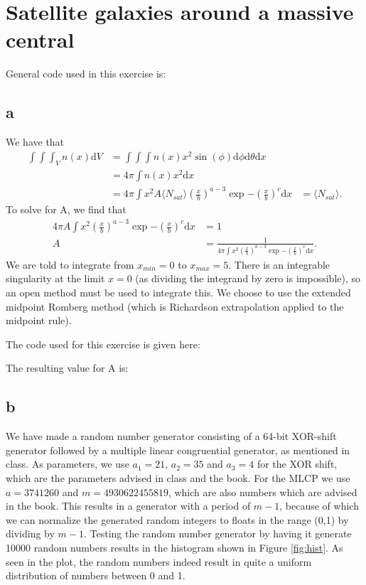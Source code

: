 \section{Satellite galaxies around a massive central}

General code used in this exercise is:




\subsection{a}

We have that
\begin{align*}
    \int\int\int_V n(x)\text{d}V &= \int\int\int n(x)x^2\sin(\phi)\text{d}\phi\text{d}\theta\text{d}x\\
    &=4\pi \int n(x)x^2\text{d}x\\
    &=4\pi \int x^2A\langle N_{sat}\rangle(\frac{x}{b})^{a-3}\exp{-(\frac{x}{b})^c}\text{d}x
    &=\langle N_{sat}\rangle.
\end{align*}
To solve for A, we find that
\begin{align*}
    4\pi A\int x^2(\frac{x}{b})^{a-3}\exp{-(\frac{x}{b})^c}\text{d}x &= 1\\
    A&=\frac{1}{4\pi \int x^2(\frac{x}{b})^{a-3}\exp{-(\frac{x}{b})^c}\text{d}x}.
\end{align*}
We are told to integrate from $x_{min}=0$ to $x_{max}=5$.
There is an integrable singularity at the limit $x=0$ (as dividing the integrand by zero is impossible), 
so an open method must be used to integrate this.
We choose to use the extended midpoint Romberg method (which is Richardson extrapolation applied to the midpoint rule).

The code used for this exercise is given here:


The resulting value for A is:




\subsection{b}

We have made a random number generator consisting of a 64-bit XOR-shift generator followed by a 
multiple linear congruential generator, as mentioned in class. 
As parameters, we use $a_1=21$, $a_2=35$ and $a_3=4$ for the XOR shift, which are the parameters advised in class and the book.
For the MLCP we use $a=3741260$ and $m=4930622455819$, which are also numbers which are advised in the book. This results in a generator with
a period of $m-1$, because of which we can normalize the generated random integers to floats in the range (0,1) by dividing by $m-1$.
Testing the random number generator by having it generate 10000 random numbers results in the histogram shown in Figure \ref{fig:hist}.
As seen in the plot, the random numbers indeed result in quite a uniform distribution of numbers between 0 and 1.

